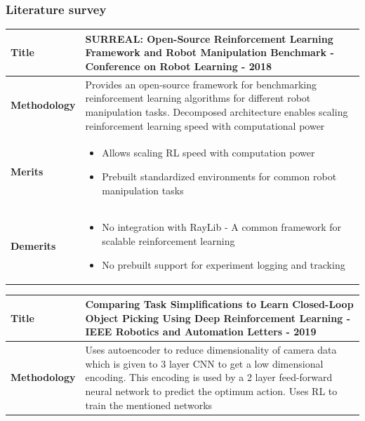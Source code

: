 \documentclass{beamer}
\begin{document}
	\begin{frame}[allowframebreaks]
		\frametitle{Literature survey}
		
		\begin{tabular}{m{2.25cm} | m{9cm}}
			\hline
			
			\textbf{Title} &
			SURREAL: Open-Source Reinforcement Learning Framework and Robot Manipulation Benchmark \cite{corl2018surreal} - Conference on Robot Learning - 2018\\
			\hline
			
			\textbf{Methodology} &
			Provides an open-source framework for benchmarking reinforcement learning algorithms for different robot manipulation tasks. Decomposed architecture enables scaling reinforcement learning speed with computational power\\
			\hline
			
			\textbf{Merits} &
			\begin{itemize}
				\item Allows scaling RL speed with computation power
				\item Prebuilt standardized environments for common robot manipulation tasks
			\end{itemize} \\
			\hline
			
			\textbf{Demerits} &
			\begin{itemize}
				\item No integration with RayLib - A common framework for scalable reinforcement learning
				\item No prebuilt support for experiment logging and tracking
			\end{itemize}\\
			\hline
			
		\end{tabular}
	
		\begin{tabular}{m{2.25cm} | m{9cm}}
			\hline
			
			\textbf{Title} &
			Comparing Task Simplifications to Learn Closed-Loop Object Picking Using Deep Reinforcement Learning \cite{tasksimplification} - IEEE Robotics and Automation Letters - 2019\\
			\hline
			
			\textbf{Methodology} &
			Uses autoencoder to reduce dimensionality of camera data which is given to 3 layer CNN to get a low dimensional encoding. This encoding is used by a 2 layer feed-forward neural network to predict the optimum action. Uses RL to train the mentioned networks\\
			\hline
			

\end{tabular}
\end{frame}
\end{document}
